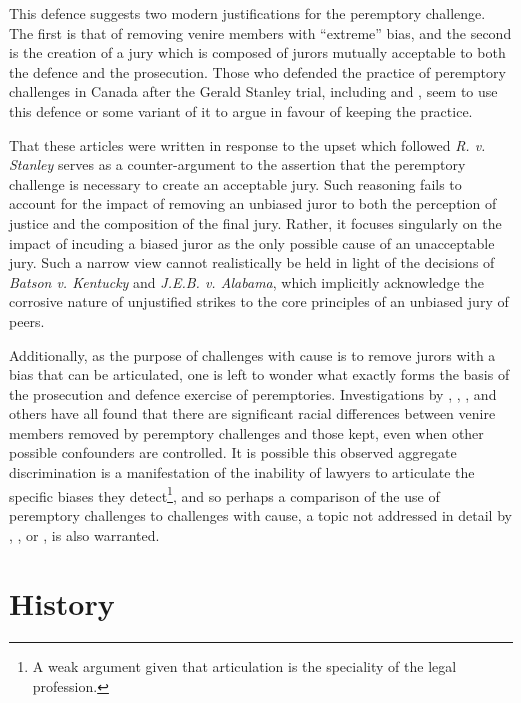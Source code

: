 This defence suggests two modern justifications for the peremptory challenge. The first is that of removing venire members with
``extreme'' bias, and the second is the creation of a jury which is composed of jurors mutually acceptable to both the defence and
the prosecution. Those who defended the practice of peremptory challenges in Canada after the Gerald Stanley trial, including
\cite{peremparegood} and \cite{macnabproper}, seem to use this defence or some variant of it to argue in favour of keeping the
practice.

That these articles were written in response to the upset which followed \textit{R. v. Stanley} serves as a counter-argument to
the assertion that the peremptory challenge is necessary to create an acceptable jury. Such reasoning fails to account for the
impact of removing an unbiased juror to both the perception of justice and the composition of the final jury. Rather, it focuses
singularly on the impact of incuding a biased juror as the only possible cause of an unacceptable jury. Such a narrow view cannot
realistically be held in light of the decisions of \textit{Batson v. Kentucky} and \textit{J.E.B. v. Alabama}, which implicitly
acknowledge the corrosive nature of unjustified strikes to the core principles of an unbiased jury of peers.

Additionally, as the purpose of challenges with cause is to remove jurors with a bias that can be articulated, one is left to
wonder what exactly forms the basis of the prosecution and defence exercise of peremptories. Investigations by
\cite{PerempChalMurder}, \cite{JurySunshineProj}, \cite{StubbornLegacy}, and others have all found that there are significant
racial differences between venire members removed by peremptory challenges and those kept, even when other possible confounders
are controlled. It is possible this observed aggregate discrimination is a manifestation of the inability of lawyers to
articulate the specific biases they detect\footnote{A weak argument given that articulation is the speciality of the legal
  profession.}, and so perhaps a comparison of the use of peremptory challenges to challenges with cause, a topic not addressed in
detail by \cite{PerempChalMurder}, \cite{JurySunshineProj}, or \cite{StubbornLegacy}, is also warranted.

\section{History} \label{sec:history}


